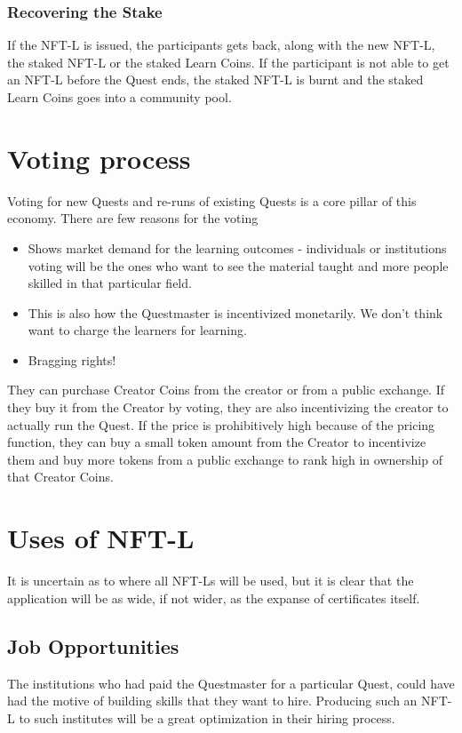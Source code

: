 \documentclass{article}
\begin{document}
        \subsubsection{Recovering the Stake}
          If the NFT-L is issued, the participants gets back, along with the new NFT-L, the staked NFT-L or the staked Learn Coins.
          \break
          If the participant is not able to get an NFT-L before the Quest ends, the staked NFT-L is burnt and the staked Learn Coins goes into a community pool.
  \section{Voting process}
    Voting for new Quests and re-runs of existing Quests is a core pillar of this economy. 
    There are few reasons for the voting
    \begin{itemize}
      \item Shows market demand for the learning outcomes - individuals or institutions voting will be the ones who want to see the material taught and more people skilled in that particular field.
      \item This is also how the Questmaster is incentivized monetarily. We don't think want to charge the learners for learning.
      \item Bragging rights!
    \end{itemize}
    They can purchase Creator Coins from the creator or from a public exchange. If they buy it from the Creator by voting, they are also incentivizing the creator to actually run the Quest.
    If the price is prohibitively high because of the pricing function, they can buy a small token amount from the Creator to incentivize them and buy more tokens from a public exchange to rank high in ownership of that Creator Coins.
  \section{Uses of NFT-L}
    It is uncertain as to where all NFT-Ls will be used, but it is clear that the application will be as wide, if not wider, as the expanse of certificates itself.
    \subsection{Job Opportunities}
      The institutions who had paid the Questmaster for a particular Quest, could have had the motive of building skills that they want to hire. Producing such an NFT-L to such institutes will be a great optimization in their hiring process.
\end{document}

